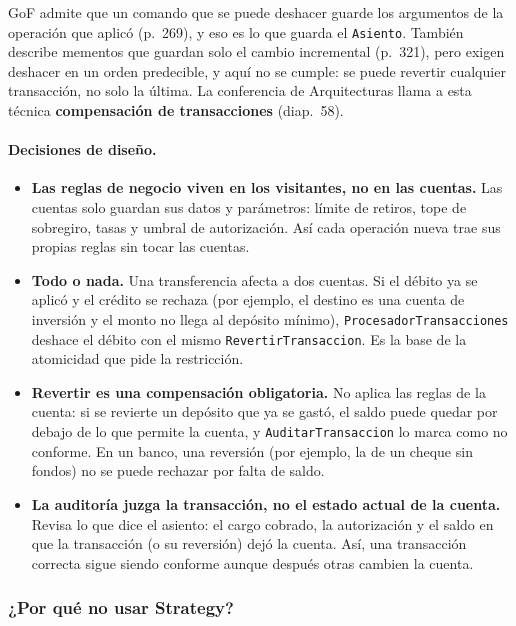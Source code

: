 GoF admite que un comando que se puede deshacer guarde los argumentos de la operación que
aplicó (p.~269), y eso es lo que guarda el \texttt{Asiento}. También describe mementos que
guardan solo el cambio incremental (p.~321), pero exigen deshacer en un orden predecible, y
aquí no se cumple: se puede revertir cualquier transacción, no solo la última. La conferencia
de Arquitecturas llama a esta técnica \textbf{compensación de transacciones} (diap.~58).

\paragraph{Decisiones de diseño.}
\begin{itemize}
  \item \textbf{Las reglas de negocio viven en los visitantes, no en las cuentas.} Las cuentas
        solo guardan sus datos y parámetros: límite de retiros, tope de sobregiro, tasas y
        umbral de autorización. Así cada operación nueva trae sus propias reglas sin tocar las
        cuentas.
  \item \textbf{Todo o nada.} Una transferencia afecta a dos cuentas. Si el débito ya se
        aplicó y el crédito se rechaza (por ejemplo, el destino es una cuenta de inversión y
        el monto no llega al depósito mínimo), \texttt{ProcesadorTransacciones} deshace el
        débito con el mismo \texttt{RevertirTransaccion}. Es la base de la atomicidad que pide
        la restricción.
  \item \textbf{Revertir es una compensación obligatoria.} No aplica las reglas de la cuenta:
        si se revierte un depósito que ya se gastó, el saldo puede quedar por debajo de lo que
        permite la cuenta, y \texttt{AuditarTransaccion} lo marca como no conforme. En un
        banco, una reversión (por ejemplo, la de un cheque sin fondos) no se puede rechazar
        por falta de saldo.
  \item \textbf{La auditoría juzga la transacción, no el estado actual de la cuenta.} Revisa
        lo que dice el asiento: el cargo cobrado, la autorización y el saldo en que la
        transacción (o su reversión) dejó la cuenta. Así, una transacción correcta sigue
        siendo conforme aunque después otras cambien la cuenta.
\end{itemize}

\subsubsection{¿Por qué no usar Strategy?}

